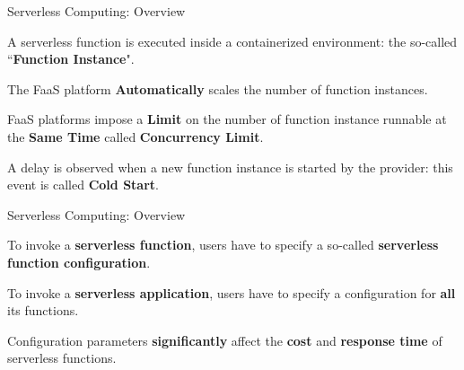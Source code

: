 \documentclass[13.5pt]{beamer}
\newcommand{\B}[1]{\textcolor{TorVergataColor}{\textbf{#1}}}
\begin{document}
\begin{frame}{Serverless Computing: Overview}
	
	\begin{block}{}
		\centering
		A serverless function is executed inside a containerized environment: the so-called ``\B{Function Instance}".
	\end{block}

	\vspace{\baselineskip}
	
	\begin{block}{}
		\centering
		The FaaS platform \B{Automatically} scales the number of function instances.
	\end{block}

	\vspace{\baselineskip}
	
	\begin{block}{}
		FaaS platforms impose a \B{Limit} on the number of function instance runnable at the \B{Same Time} called \B{Concurrency Limit}.
	\end{block}

\vspace{\baselineskip}

\begin{block}{}
	A delay is observed when a new function instance is started by the provider: this event is called \B{Cold Start}.
\end{block}
		
\end{frame} 
\begin{frame}{Serverless Computing: Overview}
	
	\begin{block}{}
		\centering
		To invoke a \B{serverless function}, users have to specify a so-called \B{serverless function configuration}.
	\end{block}
	\vspace{\baselineskip}
	\begin{block}{}
		\centering
		To invoke a \B{serverless application}, users have to specify a configuration for \B{all} its functions.
	\end{block}
	\vspace{\baselineskip}
	\begin{block}{}
		\centering
		Configuration parameters \B{significantly} affect the \B{cost} and \B{response time} of serverless functions.
	\end{block}
	
	
\end{frame} 
\end{document}
